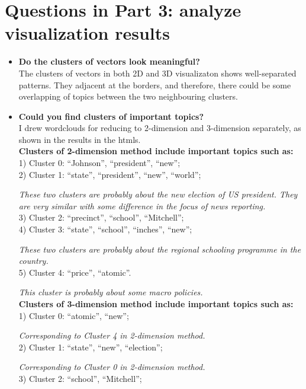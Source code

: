 \documentclass{article}
\begin{document}
\section{Questions in Part 3: analyze visualization results}
\begin{itemize}
\item \textbf{ Do the clusters of vectors look meaningful?}\\
[0.5em]
The clusters of vectors in both 2D and 3D visualizaton shows well-separated patterns. They adjacent at the borders, and therefore, there could be some overlapping of topics between the two neighbouring clusters.\\
\item \textbf{ Could you find clusters of important topics?}\\
[0.5em]
I drew wordclouds for reducing to 2-dimension and 3-dimension separately, as shown in the results in the htmls.\\
[1em]
\textbf{Clusters of 2-dimension method include important topics such as:}\\
[0.5em]
1) Cluster 0:  “Johnson”, “president”,  “new”;\\ 
2) Cluster 1: “state”, “president”, “new”, “world”;

\textit{\noindent\quad These two clusters are probably about the new election of US president. They are very similar with some difference in the focus of news reporting.}\\
3) Cluster 2: “precinct”, “school”, “Mitchell”;\\
4) Cluster 3: “state”, “school”, “inches”, “new”;

\textit{\noindent\quad These two clusters are probably about the regional schooling programme in the country.}\\
5) Cluster 4: “price”, “atomic”.

\textit{\noindent\quad This cluster is probably about some macro policies.}\\
[1em]
\textbf{Clusters of 3-dimension method include important topics such as:}\\
[0.5em]
1) Cluster 0: “atomic”, “new”;

\textit{\noindent\quad Corresponding to Cluster 4 in 2-dimension method.}\\
2) Cluster 1: “state”, “new”, “election”;

\textit{\noindent\quad Corresponding to Cluster 0 in 2-dimension method.}\\
3) Cluster 2: “school”, “Mitchell”;


\end{itemize}
\end{document}
